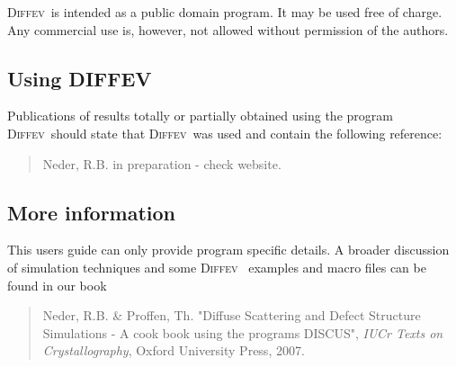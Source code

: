 \documentclass[11pt]{report}
\newcommand{\Diffev}{\textsc{Diffev\ }}
\begin{document}
\Diffev is intended as a public domain program. It may be used free
of charge.  Any commercial use is, however, not allowed without permission
of the authors.


\subsection*{Using DIFFEV}

Publications of results totally or partially obtained using the program
\Diffev should state that \Diffev was used and contain the
following reference:

\begin{quote}
  {\sc Neder, R.B.} in preparation - check website.
\end{quote}


\subsection*{More information}

This users guide can only provide program specific details. A
broader discussion of simulation techniques and some \Diffev
examples and macro files can be found in our book

\begin{quote}
  {\sc Neder, R.B. \& Proffen, Th.} "Diffuse Scattering and Defect Structure
  Simulations - A cook book using the programs DISCUS", {\it IUCr Texts on
  Crystallography}, Oxford University Press, 2007.
\end{quote}


\tableofcontents

%
%






\appendix





\end{document}
